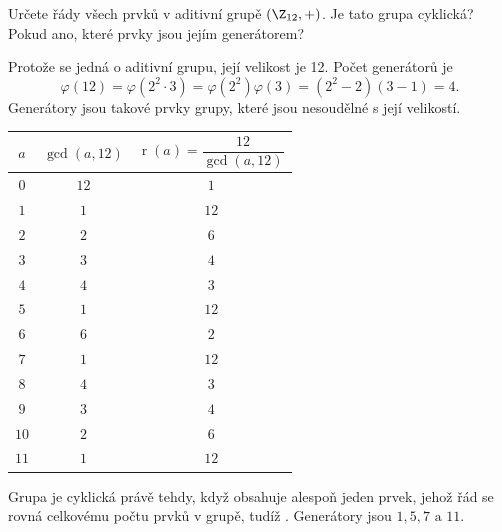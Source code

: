 \documentclass[11pt, a4paper]{article}
\DeclareMathOperator*{\ra}{r}
\begin{document}
\begin{exercise}
Určete řády všech prvků v aditivní grupě $(\Z_{12}, +)$. Je tato grupa cyklická? Pokud ano, které prvky jsou jejím generátorem?
\end{exercise}
\begin{solution}
Protože se jedná o aditivní grupu, její velikost je 12. Počet generátorů je
\begin{equation}
	\varphi(12) = \varphi \left(2^2 \cdot 3\right) = \varphi\left(2^2\right) \varphi(3) = \left(2^2 - 2\right) (3-1) = 4.
\end{equation}
Generátory jsou takové prvky grupy, které jsou nesoudělné s její velikostí.
\vspace{-1em}
\begin{center}
	\begin{tabular}{ c|c|c } 
	$a$ & $\gcd(a, 12)$ & $\ra(a) = \dfrac{12}{\gcd(a, 12)}$ \\
	\hline
	$0$ & $12$ & $1$ \\
	$1$ & $1$ & $12$ \\
	$2$ & $2$ & $6$ \\
	$3$ & $3$ & $4$ \\
	$4$ & $4$ & $3$ \\
	$5$ & $1$ & $12$ \\
	$6$ & $6$ & $2$ \\
	$7$ & $1$ & $12$ \\
	$8$ & $4$ & $3$ \\
	$9$ & $3$ & $4$ \\
	$10$ & $2$ & $6$ \\
	$11$ & $1$ & $12$
	\end{tabular}
\end{center}
\vspace{-1em}
Grupa je cyklická právě tehdy, když obsahuje alespoň jeden prvek, jehož řád se rovná celkovému počtu prvků v grupě, tudíž . Generátory jsou $1, 5, 7 \text{ a } 11$.
\end{solution}
\end{document}
